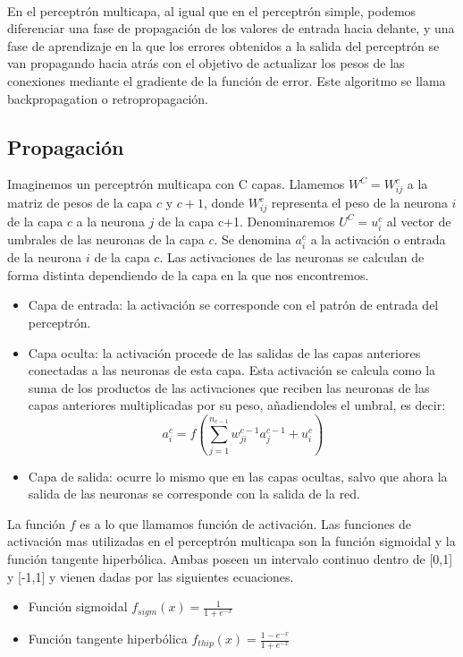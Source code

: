 \\En el perceptrón multicapa, al igual que en el perceptrón simple, podemos diferenciar una fase de propagación de los valores de entrada hacia delante, y una fase de aprendizaje en la que los errores obtenidos a la salida del perceptrón se van propagando hacia atrás con el objetivo de actualizar los pesos de las conexiones mediante el gradiente de la función de error. Este algoritmo se llama backpropagation o retropropagación.
\subsection{Propagación}
Imaginemos un perceptrón multicapa con C capas. Llamemos ${W^{C} = W^{c}_{ij}}$ a la matriz de pesos de la capa ${c}$ y ${c+1}$, donde ${W^{c}_{ij}}$ representa el peso de la neurona ${i}$ de la capa ${c}$ a la neurona ${j}$ de la capa c+1. Denominaremos ${U^{C} = u^{c}_{i}}$ al vector de umbrales de las neuronas de la capa ${c}$. Se denomina ${a^{c}_{i}}$ a la activación o entrada de la neurona ${i}$ de la capa ${c}$. Las activaciones de las neuronas se calculan de forma distinta dependiendo de la capa en la que nos encontremos.
\begin{itemize}
\item Capa de entrada: la activación se corresponde con el patrón de entrada del perceptrón.
\item Capa oculta: la activación procede de las salidas de las capas anteriores conectadas a las neuronas de esta capa. Esta activación se calcula como la suma de los productos de las activaciones que reciben las neuronas de las capas anteriores multiplicadas por su peso, añadiendoles el umbral, es decir:\\
\begin{equation}
a_{i}^{c} = f(\sum_{j=1}^{n_{c-1}}w_{ji}^{c-1}a_{j}^{c-1}+u_{i}^{c})
\end{equation}
\item Capa de salida: ocurre lo mismo que en las capas ocultas, salvo que ahora la salida de las neuronas se corresponde con la salida de la red.
\end{itemize}
La función ${f}$ es a lo que llamamos función de activación. Las funciones de activación mas utilizadas en el perceptrón multicapa son la función sigmoidal y la función tangente hiperbólica. Ambas poseen un intervalo continuo dentro de [0,1] y [-1,1] y vienen dadas por las siguientes ecuaciones.
\begin{itemize}
\item Función sigmoidal ${f_{sigm}(x)=\frac{1}{1+e^{-x}}}$
\item Función tangente hiperbólica ${f_{thip}(x)=\frac{1-e^{-x}}{1+e^{-x}}}$
\end{itemize}
